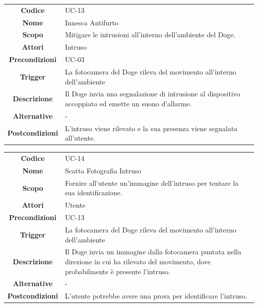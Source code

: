 \documentclass{article}
\begin{document}
    \begin{adjustbox}{center}
    \begin{tabular}{|c|p{10cm}|}
    \hline
    \textbf{Codice} & UC-13 \\
    \textbf{Nome} & Innesca Antifurto \\
    \textbf{Scopo} & Mitigare le intrusioni all'interno dell'ambiente del Doge. \\
    \textbf{Attori} & Intruso \\
    \textbf{Precondizioni} & UC-03 \\
    \textbf{Trigger} & La fotocamera del Doge rileva del movimento all'interno dell'ambiente \\
    \textbf{Descrizione} & Il Doge invia una segnalazione di intrusione al dispositivo accoppiato ed emette un suono d'allarme. \\
    \textbf{Alternative} & - \\
    \textbf{Postcondizioni} & L'intruso viene rilevato e la sua presenza viene segnalata all'utente. \\
    \hline
    \end{tabular}
    \end{adjustbox}
    
    \begin{adjustbox}{center}
    \begin{tabular}{|c|p{10cm}|}
    \hline
    \textbf{Codice} & UC-14 \\
    \textbf{Nome} & Scatta Fotografia Intruso \\
    \textbf{Scopo} & Fornire all'utente un'immagine dell'intruso per tentare la sua identificazione. \\
    \textbf{Attori} & Utente \\
    \textbf{Precondizioni} & UC-13 \\
    \textbf{Trigger} & La fotocamera del Doge rileva del movimento all'interno dell'ambiente \\
    \textbf{Descrizione} & Il Doge invia un immagine dalla fotocamera puntata nella direzione in cui ha rilevato del movimento, dove probabilmente è presente
    l'intruso. \\
    \textbf{Alternative} & - \\
    \textbf{Postcondizioni} & L'utente potrebbe avere una prova per identificare l'intruso. \\
    \hline
    \end{tabular}
    \end{adjustbox}
    
\end{document}
